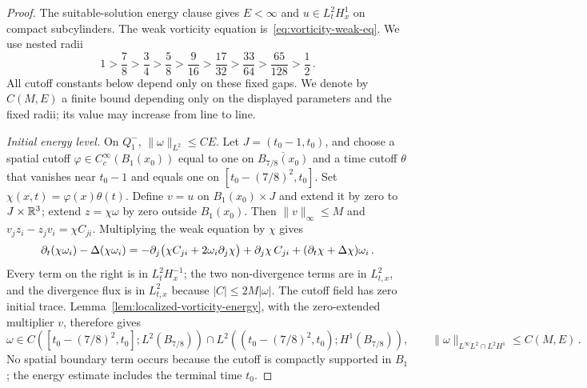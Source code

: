 \documentclass[11pt,letterpaper]{article}
\numberwithin{equation}{section}
\theoremstyle{plain}
\theoremstyle{definition}
\theoremstyle{remark}
\begin{document}
\begin{proof}
The suitable-solution energy clause gives $E<\infty$ and $u\in L^2_tH^1_x$ on compact subcylinders. The weak vorticity equation is~\eqref{eq:vorticity-weak-eq}. We use nested radii
\[
 1>\frac78>\frac34>\frac58>\frac9{16}>\frac{17}{32}>\frac{33}{64}>\frac{65}{128}>\frac12\,.
\]
All cutoff constants below depend only on these fixed gaps. We denote by $C(M,E)$ a finite bound depending only on the displayed parameters and the fixed radii; its value may increase from line to line.

\emph{Initial energy level.} On $Q_1^-$, $\|\omega\|_{L^2}\le C E$. Let $J=(t_0-1,t_0)$, and choose a spatial cutoff $\varphi\in C_c^\infty(B_1(x_0))$ equal to one on $\overline{B_{7/8}(x_0)}$ and a time cutoff $\theta$ that vanishes near $t_0-1$ and equals one on $[t_0-(7/8)^2,t_0]$. Set $\chi(x,t)=\varphi(x)\theta(t)$. Define $v=u$ on $B_1(x_0)\times J$ and extend it by zero to $J\times\mathbb{R}^3$; extend $z=\chi\omega$ by zero outside $B_1(x_0)$. Then $\|v\|_\infty\le M$ and $v_jz_i-z_jv_i=\chi C_{ji}$. Multiplying the weak equation by $\chi$ gives
\[
 \partial_t(\chi\omega_i)-\Delta(\chi\omega_i)
 =-\partial_j\big(\chi C_{ji}+2\omega_i\partial_j\chi\big)
   +\partial_j\chi\,C_{ji}+(\partial_t\chi+\Delta\chi)\omega_i\,.
\]
Every term on the right is in $L^2_tH^{-1}_x$; the two non-divergence terms are in $L^2_{t,x}$, and the divergence flux is in $L^2_{t,x}$ because $|C|\le2M|\omega|$. The cutoff field has zero initial trace. Lemma~\ref{lem:localized-vorticity-energy}, with the zero-extended multiplier $v$, therefore gives
\begin{equation}\label{eq:vorticity-base-energy}
 \omega\in C([t_0-(7/8)^2,t_0];L^2(B_{7/8}))
       \cap L^2((t_0-(7/8)^2,t_0);H^1(B_{7/8})),
 \qquad \|\omega\|_{L^\infty L^2\cap L^2H^1}\le C(M,E)\,.
\end{equation}
No spatial boundary term occurs because the cutoff is compactly supported in $B_1$; the energy estimate includes the terminal time $t_0$.


\end{proof}
\end{document}
